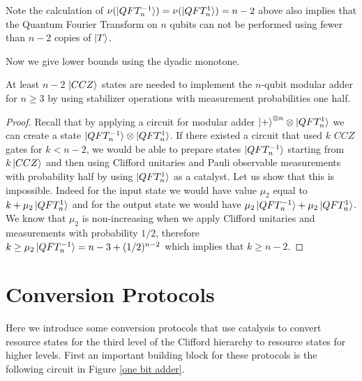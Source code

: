 \documentclass[12pt]{dalthesis}
\begin{document}
Note the calculation of $\nu(\ket{QFT_n^{-1}}) = \nu(\ket{QFT_n^{1}}) = n-2$ above also implies that the Quantum Fourier Transform on $n$ qubits can not be performed using fewer than $n-2$ copies of $\ket{T}$.

Now we give lower bounds using the dyadic monotone.


\begin{lemma}
At least $n-2$ $\ket{CCZ}$ states are needed to implement the $n$-qubit modular adder for $n \geq 3$ by using stabilizer operations with measurement probabilities one half.
\end{lemma}
\begin{proof}
Recall that by applying a circuit for modular adder $\ket{+}^{\otimes n} \otimes \ket{QFT_n^1}$ we can create a state $\ket{QFT_n^{-1}} \otimes \ket{QFT_n^1}$. If there existed a circuit that used $k$ $CCZ$ gates for $k < n-2$, we would be able to prepare states $\ket{QFT_n^{-1}}$ starting from $k \ket{CCZ}$ and then using Clifford unitaries and Pauli observable measurements with probability half by using $\ket{QFT_n^1}$ as a catalyst. Let us show that this is impossible. Indeed for the input state we would have value $\mu_2$ equal to $k + \mu_2 \ket{QFT_n^1}$ and for the output state we would have $\mu_2 \ket{QFT_n^{-1}} + \mu_2 \ket{QFT_n^1}$. We know that $\mu_2$ is non-increasing when we apply Clifford unitaries and measurements with probability $1/2$, therefore $k \geq \mu_2 \ket{QFT_n^{-1}} = n - 3 +(1/2)^{n-2}$ which implies that $k \geq n-2$.
\end{proof}

\section{Conversion Protocols}
Here we introduce some conversion protocols that use catalysis to convert resource states for the third level of the Clifford hierarchy to resource states for higher levels. First an important building block for these protocols is the following circuit in Figure \ref{one bit adder}.

\vspace{2mm}
\end{document}
